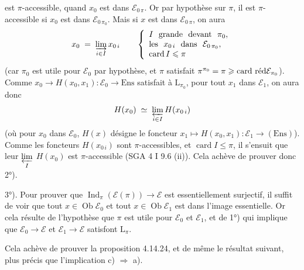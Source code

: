 \documentclass[11pt]{article}
\newcommand{\printedpage}[1]{\marginpar{\footnotesize p.~#1}}
\newcommand{\msp}[1]{\marginpar{\footnotesize [#1]}}
\newcommand{\cE}{\mathcal{E}}
\newcommand{\Ob}{\operatorname{Ob}}
\newcommand{\Ind}{\operatorname{Ind}}
\newcommand{\Ens}{\mathrm{Ens}}
\newcommand{\card}{\operatorname{card}}
\newcommand{\cardred}{\operatorname{card}\,\text{\upshape réd}}
\begin{document}
\setcounter{footnote}{174}

\printedpage{159}

\msp{page 419}
est $\pi$-accessible, quand $x_0$ est dans $\cE_{0\,\pi}$. Or par hypothèse sur $\pi$, il est $\pi$-accessible si $x_0$ est dans $\cE_{0\,\pi_0}$. Mais si $x$ est dans $\cE_{0\,\pi}$, on aura %
\[
x_0 \;=\; \varinjlim_{i\in I} x_{0\,i} \qquad
\left\{
\begin{array}{l}
I\ \ \text{grande}\ \ \text{devant}\ \ \pi_0,\\
\text{les}\ \ x_{0\,i}\ \ \text{dans}\ \ \cE_{0\,\pi_0},\\
\card I \leqslant \pi
\end{array}
\right.
\]
(car $\pi_0$ est utile pour $\cE_0$ par hypothèse, et $\pi$ satisfait $\pi^{\pi_0} = \pi \geqslant \cardred \cE_{\pi_0}$). Comme $x_0 \longrightarrow H(x_0,x_1) : \cE_0 \longrightarrow \Ens$ satisfait à $\mathrm{L}_{\pi_0}$, pour tout $x_1$ dans $\cE_1$, on aura donc %
\[
H(x_0) \;\simeq\; \varprojlim_{i\in I} H(x_{0\,i})
\]
(où pour $x_0$ dans $\cE_0$, $H(x)$ désigne le foncteur $x_1 \longmapsto H(x_0,x_1) : \cE_1 \longrightarrow (\Ens)$). Comme %
les foncteurs $H(x_{0\,i})$ sont $\pi$-accessibles, et $\card I \leqslant \pi$, il s'ensuit que leur $\varprojlim\limits_{I}$ $H(x_0)$ est $\pi$-accessible (SGA 4 I 9.6 (ii)). Cela achève de prouver donc 2°).

3°). Pour prouver que $\Ind_\pi(\cE(\pi)) \longrightarrow \cE$ est essentiellement surjectif, il suffit de voir que tout $x \in \Ob\cE_0$ et tout $x \in \Ob\cE_1$
\msp{page 420}
est dans l'image essentielle. Or cela résulte de l'hypothèse que $\pi$ est utile pour $\cE_0$ et $\cE_1$, et de 1°) qui implique que $\cE_0 \longrightarrow \cE$ et $\cE_1 \longrightarrow \cE$ satisfont $\mathrm{L}_\pi$.

Cela achève de prouver la proposition 4.14.24, et de même le résultat suivant, plus précis que l'implication c) $\Longrightarrow$ a).
\end{document}
